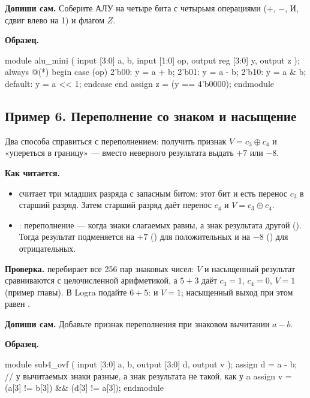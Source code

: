 \textbf{Допиши сам.} Соберите АЛУ на четыре бита с четырьмя операциями ($+$,
$-$, И, сдвиг влево на 1) и флагом $Z$.

\textbf{Образец.}
\begin{vcode}
module alu_mini (
    input  [3:0] a, b,
    input  [1:0] op,
    output reg [3:0] y,
    output       z
);
    always @(*) begin
        case (op)
            2'b00:   y = a + b;
            2'b01:   y = a - b;
            2'b10:   y = a & b;
            default: y = a << 1;
        endcase
    end
    assign z = (y == 4'b0000);
endmodule
\end{vcode}

\subsection{Пример 6. Переполнение со знаком и насыщение}

Два способа справиться с переполнением: получить признак $V=c_3\oplus c_4$
и «упереться в границу» --- вместо неверного результата выдать $+7$ или $-8$.


\textbf{Как читается.}
\begin{itemize}
  \item {} считает три младших разряда с запасным битом: этот бит и есть перенос $c_3$ в старший разряд. Затем старший разряд даёт перенос $c_4$ и $V=c_3\oplus c_4$.
  \item {}: переполнение --- когда знаки слагаемых равны, а знак результата другой (). Тогда результат подменяется на $+7$ () для положительных и на $-8$ () для отрицательных.
\end{itemize}
\textbf{Проверка.}  перебирает все 256 пар знаковых
чисел: $V$ и насыщенный результат сравниваются с целочисленной арифметикой, а
$5+3$ даёт $c_3=1$, $c_4=0$, $V=1$ (пример главы). В Logra подайте $6+5$:
 и $V=1$; насыщенный выход при этом равен .

\textbf{Допиши сам.} Добавьте признак переполнения при знаковом вычитании $a-b$.

\textbf{Образец.}
\begin{vcode}
module sub4_ovf (
    input  [3:0] a, b,
    output [3:0] d,
    output       v
);
    assign d = a - b;
    // у вычитаемых знаки разные, а знак результата не такой, как у a
    assign v = (a[3] != b[3]) && (d[3] != a[3]);
endmodule
\end{vcode}

